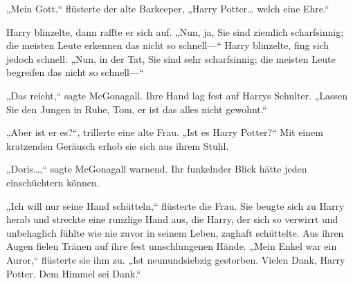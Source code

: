 „Mein Gott,“ flüsterte der alte Barkeeper, „Harry Potter… welch eine Ehre.“

Harry blinzelte, dann raffte er sich auf. „Nun, ja, Sie sind ziemlich scharfsinnig; die meisten Leute erkennen das nicht so schnell—“
Harry blinzelte, fing sich jedoch schnell. „Nun, in der Tat, Sie sind sehr scharfsinnig; die meisten Leute begreifen das nicht so schnell—“

„Das reicht,“ sagte McGonagall. Ihre Hand lag fest auf Harrys Schulter. „Lassen Sie den Jungen in Ruhe, Tom, er ist das alles nicht gewohnt.“

„Aber ist er es?“, trillerte eine alte Frau. „Ist es Harry Potter?“ Mit einem kratzenden Geräusch erhob sie sich aus ihrem Stuhl.

„Doris…,“ sagte McGonagall warnend. Ihr funkelnder Blick hätte jeden einschüchtern können.

„Ich will nur seine Hand schütteln,“ flüsterte die Frau. Sie beugte sich zu Harry herab und streckte eine runzlige Hand aus, die Harry, der sich so verwirrt und unbehaglich fühlte wie nie zuvor in seinem Leben, zaghaft schüttelte. Aus ihren Augen fielen Tränen auf ihre fest umschlungenen Hände. „Mein Enkel war ein Auror,“ flüsterte sie ihm zu. „Ist neunundsiebzig gestorben. Vielen Dank, Harry Potter. Dem Himmel sei Dank.“

